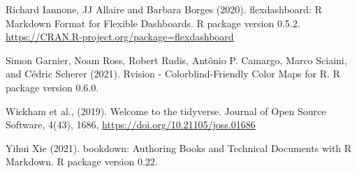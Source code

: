 \documentclass[11pt,a4paper,]{article}
\begin{document}
Richard Iannone, JJ Allaire and Barbara Borges (2020). flexdashboard: R Markdown Format for Flexible Dashboards. R package version 0.5.2. \url{https://CRAN.R-project.org/package=flexdashboard}

Simon Garnier, Noam Ross, Robert Rudis, Antônio P. Camargo, Marco Sciaini, and Cédric Scherer (2021). Rvision - Colorblind-Friendly Color Maps for R. R package version 0.6.0.

Wickham et al., (2019). Welcome to the tidyverse. Journal of Open Source Software, 4(43), 1686, \url{https://doi.org/10.21105/joss.01686}

Yihui Xie (2021). bookdown: Authoring Books and Technical Documents with R Markdown. R package version 0.22.

\printbibliography
\end{document}
